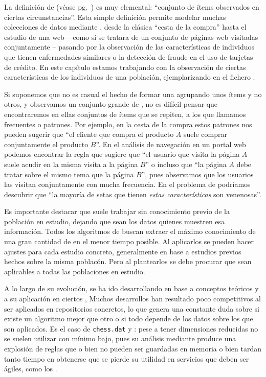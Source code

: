 La definición de \transaccion (véase pg.~\pageref{def:1:3:2:transaccion}) es muy elemental: "`conjunto de ítems observados en ciertas circunstancias"'. Esta simple definición permite modelar muchas colecciones de datos mediante \transacciones, desde la clásica "`cesta de la compra"' hasta el estudio de una \sn web -- como si se tratara de un conjunto de páginas web visitadas conjuntamente -- pasando por la observación de las características de individuos que tienen enfermedades similares o la detección de fraude en el uso de tarjetas de crédito. En este capítulo estamos trabajando con la observación de ciertas características de los individuos de una población, ejemplarizando en el fichero \mushroom.

Si suponemos que no es casual el hecho de formar una \transaccion agrupando unos ítems y no otros, y observamos un conjunto grande de \transacciones, no es difícil pensar que encontraremos en ellas conjuntos de ítems que se repiten, a los que llamamos \itemsets frecuentes o patrones. Por ejemplo, en la cesta de la compra estos patrones nos pueden sugerir que "`el cliente que compra el producto $A$ suele comprar conjuntamente el producto $B$"'. En el análisis de navegación en un portal web podemos encontrar la regla que sugiere que "`el usuario que visita la página $A$ suele acudir en la misma visita a la página $B$"' o incluso que "`la página $A$ debe tratar sobre el mismo tema que la página $B$"', pues observamos que los usuarios las visitan conjuntamente con mucha frecuencia. En el problema de \clasificacion podríamos descubrir que "`la mayoría de setas que tienen \emph{estas características} son venenosas"'.

Es importante destacar que \ARM suele trabajar sin conocimiento previo de la población en estudio, dejando que sean los datos quienes muestren esa información. Todos los algoritmos de \ARM buscan extraer el máximo conocimiento de una gran cantidad de \transacciones en el menor tiempo posible. Al aplicarlos se pueden hacer ajustes para cada estudio concreto, generalmente en base a estudios previos hechos sobre la misma poblacón. Pero al plantearlos se debe procurar que sean aplicables a todas las poblaciones en estudio.

A lo largo de su evolución, \ARM se ha ido desarrollando en base a conceptos teóricos y a su aplicación en ciertos \datasets, Muchos desarrollos han resultado poco competitivos al ser aplicados en repositorios concretos, lo que genera una constante duda sobre si existe un algoritmo mejor que otro o si todo depende de los datos sobre los que son aplicados. Es el caso de \texttt{chess.dat} y \mushroom: pese a tener dimensiones reducidas no se suelen utilizar con \soporte mínimo bajo, pues su análisis mediante \ARM produce una explosión de reglas que o bien no pueden ser guardadas en memoria o bien tardan tanto tiempo en obtenerse que se pierde su utilidad en servicios que deben ser ágiles, como los \sr.

